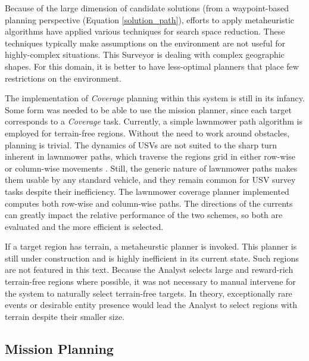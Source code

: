\documentclass{tamuccthesis}
\begin{document}
Because of the large dimension of candidate solutions (from a waypoint-based planning perspective (Equation \ref{solution_path}), efforts to apply metaheuristic algorithms have applied various techniques for search space reduction. These techniques typically make assumptions on the environment are not useful for highly-complex situations. This Surveyor is dealing with complex geographic shapes. For this domain, it is better to have less-optimal planners that place few restrictions on the environment. 

The implementation of \textit{Coverage} planning within this system is still in its infancy. Some form was needed to be able to use the mission planner, since each target corresponds to a \textit{Coverage} task. Currently, a simple lawnmower path algorithm is employed for terrain-free regions. Without the need to work around obstacles, planning is trivial. The dynamics of USVs are not suited to the sharp turn inherent in lawnmower paths, which traverse the regions grid in either row-wise or column-wise movements \cite{liu:2016}. Still, the generic nature of lawnmower paths makes them usable by any standard vehicle, and they remain common for USV survey tasks despite their inefficiency. The lawnmower coverage planner implemented computes both row-wise and column-wise paths. The directions of the currents can greatly impact the relative performance of the two schemes, so both are evaluated and the more efficient is selected. 

If a target region has terrain, a metaheurstic planner is invoked. This planner is still under construction and is highly inefficient in its current state. Such regions are not featured in this text. Because the Analyst selects large and reward-rich terrain-free regions where possible, it was not necessary to manual intervene for the system to naturally select terrain-free targets. In theory, exceptionally rare events or desirable entity presence would lead the Analyst to select regions with terrain despite their smaller size.


\subsection{Mission Planning}
\end{document}
